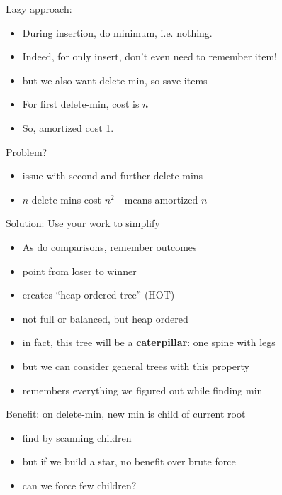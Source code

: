 \documentclass{article}
\begin{document}
Lazy approach:
\begin{itemize}
\item During insertion, do minimum, i.e. nothing.
\item Indeed, for only insert, don't even need to remember item!
\item but we also want delete min, so save items
\item For first delete-min, cost is $n$
\item So, amortized cost 1.
\end{itemize}

Problem?
\begin{itemize}
\item issue with second and further delete mins
\item $n$ delete mins cost $n^2$---means amortized $n$
\end{itemize}

Solution: Use your work to simplify
\begin{itemize}
\item As do comparisons, remember outcomes
\item point from loser to winner
\item creates ``heap ordered tree'' (HOT)
\item not full or balanced, but heap ordered
\item in fact, this tree will be a \textbf{caterpillar}: one spine
  with legs
\item but we can consider general trees with this property
\item remembers everything we figured out while finding min
\end{itemize}

Benefit: on delete-min, new min is child of current root
\begin{itemize}
\item find by scanning children
\item but if we build a star, no benefit over brute force
\item can we force few children?
\end{itemize}
\end{document}
